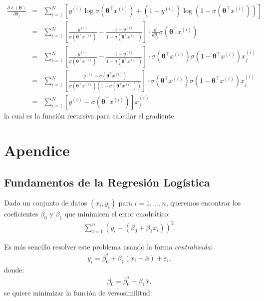 \documentclass[12pt]{article}
\begin{document}
\begin{eqnarray}
\frac{\partial \ell(\boldsymbol{\theta})}{\partial \theta_j} &=& 
\sum_{i=1}^{N} \left[ y^{(i)} \log \sigma(\boldsymbol{\theta}^{\top} x^{(i)}) +
(1 - y^{(i)}) \log (1 - \sigma(\boldsymbol{\theta}^{\top} x^{(i)})) \right]\\
&=& \sum_{i=1}^{N} \left[ \frac{y^{(i)}}{\sigma(\boldsymbol{\theta}^{\top} x^{(i)})} 
- \frac{1 - y^{(i)}}{1 - \sigma(\boldsymbol{\theta}^{\top} x^{(i)})} \right]
\cdot \frac{d}{d\theta_j} \sigma(\boldsymbol{\theta}^{\top} x^{(i)})\\
&=& \sum_{i=1}^{N} \left[ \frac{y^{(i)}}{\sigma(\boldsymbol{\theta}^{\top} x^{(i)})} 
- \frac{1 - y^{(i)}}{1 - \sigma(\boldsymbol{\theta}^{\top} x^{(i)})} \right]
\cdot  \sigma(\boldsymbol{\theta}^{\top} x^{(i)})\sigma(1-\boldsymbol{\theta}^{\top} x^{(i)})x_{j}^{(i)}\\
&=& \sum_{i=1}^{N} \left[ \frac{y^{(i)}- \sigma(\boldsymbol{\theta}^{\top}x^{(i)})}
{\sigma(\boldsymbol{\theta}^{\top} x^{(i)})(1 - \sigma(\boldsymbol{\theta}^{\top} x^{(i)}))} \right]
\cdot  \sigma(\boldsymbol{\theta}^{\top} x^{(i)})\sigma(1-\boldsymbol{\theta}^{\top} x^{(i)})x_{j}^{(i)}\\
&=&\sum_{i=1}^{N}\left[y^{(i)}-\sigma(\boldsymbol{\theta}^{\top} x^{(i)})\right]x_{j}^{(i)} 
\end{eqnarray}
la cual es la funci\'on recursiva para calcular el gradiente.


\section{Apendice}

\subsection{Fundamentos de la Regresi\'on Log\'istica}

Dado un conjunto de datos $(x_i, y_i)$ para $i = 1, \dots, n$, queremos encontrar los coeficientes $\beta_0$ y $\beta_1$ que minimicen el error cuadr\'atico:
\begin{eqnarray*}
\sum_{i=1}^{n} (y_i - (\beta_0 + \beta_1 x_i))^2.
\end{eqnarray*}


Es m\'as sencillo resolver este problema usando la forma \emph{centralizada}:
\begin{eqnarray*}
y_i = \beta_0^* + \beta_1(x_i - \bar{x}) + \varepsilon_i,
\end{eqnarray*}
donde:
\begin{eqnarray*}
\beta_0 = \beta_0^* - \beta_1 \bar{x},
\end{eqnarray*}
se quiere minimizar la funci\'on de versosimilitud:
\end{document}
